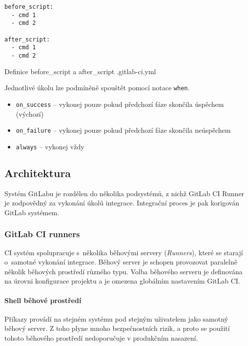\begin{listing}[ht]
\begin{verbatim}
before_script:
  - cmd 1
  - cmd 2

after_script:
  - cmd 1
  - cmd 2
\end{verbatim}
\caption{Definice before\_script a after\_script .gitlab-ci.yml}
\end{listing}

Jednotlivé úkolu lze podmíněně spouštět pomocí notace \verb|when|.

\begin{itemize}
  \item \verb|on_success| -- vykonej pouze pokud předchozí fáze skončila úspěchem (výchozí) 
  \item \verb|on_failure| -- vykonej pouze pokud předchozí fáze skončila neúspěchem
  \item \verb|always| -- vykonej vždy
\end{itemize}

\subsection{Architektura}

Systém GitLabu je rozdělen do několika podsystémů, z nichž GitLab CI Runner je zodpovědný za vykonání úkolů integrace.
Integrační proces je pak korigován GitLab systémem.
\cite{gitlab_architecture}

\subsubsection{GitLab CI runners}

CI systém spolupracuje s~několika běhovými servery (\textit{Runners}), které se starají o~samotné vykonání integrace.
Běhový server je schopen provozovat paralelně několik běhových prostředí různého typu.
Volba běhového serveru je definována na úrovni konfigurace projektu a je omezena globálním nastavením GitLab CI.


\paragraph{Shell běhové prostředí}

Příkazy provádí na stejném systému pod stejným uživatelem jako samotný běhový server.
Z toho plyne mnoho bezpečnostních rizik, a proto se použití tohoto běhového prostředí nedoporučuje v produkčním nasazení.

